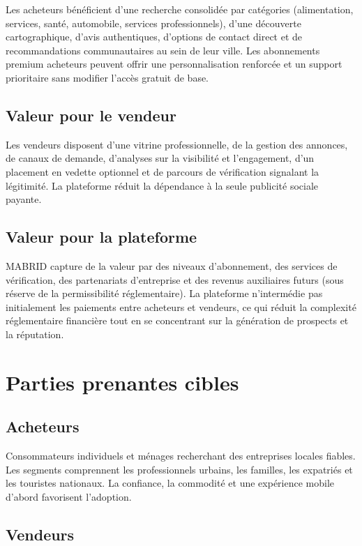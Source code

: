 Les acheteurs bénéficient d'une recherche consolidée par catégories (alimentation, services, santé, automobile, services professionnels), d'une découverte cartographique, d'avis authentiques, d'options de contact direct et de recommandations communautaires au sein de leur ville. Les abonnements premium acheteurs peuvent offrir une personnalisation renforcée et un support prioritaire sans modifier l'accès gratuit de base.

\subsection{Valeur pour le vendeur}

Les vendeurs disposent d'une vitrine professionnelle, de la gestion des annonces, de canaux de demande, d'analyses sur la visibilité et l'engagement, d'un placement en vedette optionnel et de parcours de vérification signalant la légitimité. La plateforme réduit la dépendance à la seule publicité sociale payante.

\subsection{Valeur pour la plateforme}

MABRID capture de la valeur par des niveaux d'abonnement, des services de vérification, des partenariats d'entreprise et des revenus auxiliaires futurs (sous réserve de la permissibilité réglementaire). La plateforme n'intermédie pas initialement les paiements entre acheteurs et vendeurs, ce qui réduit la complexité réglementaire financière tout en se concentrant sur la génération de prospects et la réputation.

\section{Parties prenantes cibles}

\subsection{Acheteurs}

Consommateurs individuels et ménages recherchant des entreprises locales fiables. Les segments comprennent les professionnels urbains, les familles, les expatriés et les touristes nationaux. La confiance, la commodité et une expérience mobile d'abord favorisent l'adoption.

\subsection{Vendeurs}

